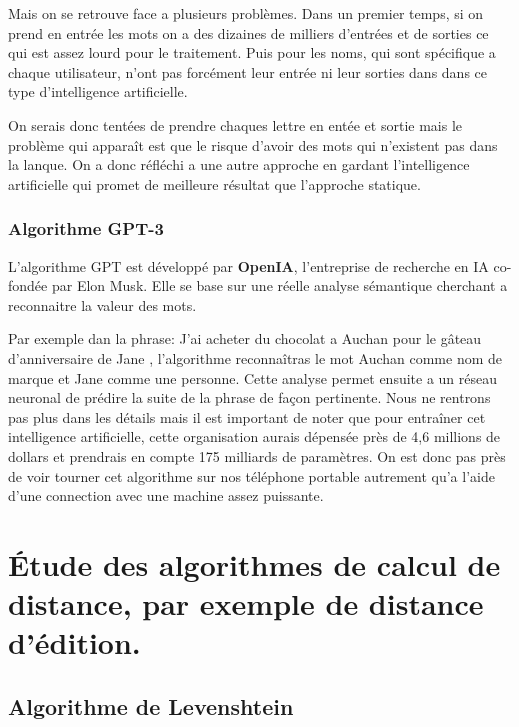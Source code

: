 \documentclass[final, 10pt]{report}
\begin{document}
        Mais on se retrouve face a plusieurs problèmes. 
        Dans un premier temps, si on prend en entrée les mots on a des dizaines de milliers d'entrées et de sorties ce qui est assez lourd pour le traitement.
        Puis pour les noms, qui sont spécifique a chaque utilisateur, n'ont pas forcément leur entrée ni leur sorties dans dans ce type d'intelligence artificielle.
        
        On serais donc tentées de prendre chaques lettre en entée et sortie mais le problème qui apparaît est que le risque d'avoir des mots qui n'existent pas dans la lanque.
        On a donc réfléchi a une autre approche en gardant l'intelligence artificielle qui promet de meilleure résultat que l'approche statique.
    
    \subsection{Algorithme GPT-3}


        L'algorithme GPT est développé par \textbf{OpenIA}, l’entreprise de recherche en IA co-fondée par Elon Musk\cite{noauthor_quest_2021}.
        Elle se base sur une réelle analyse sémantique cherchant a reconnaitre la valeur des mots.
        
        Par exemple dan la phrase: \og J'ai acheter du chocolat a Auchan pour le gâteau d'anniversaire de Jane \fg{}, l'algorithme reconnaîtras le mot \og Auchan \fg{} comme nom de marque et \og Jane \fg{} comme une personne.
        Cette analyse permet ensuite a un réseau neuronal de prédire la suite de la phrase de façon pertinente.
        Nous ne rentrons pas plus dans les détails mais il est important de noter que pour entraîner cet intelligence artificielle, cette organisation aurais dépensée près de 4,6 millions de dollars\cite{noauthor_quest_2021} et prendrais en compte 175 milliards de paramètres\cite{noauthor_quest_2021}.
        On est donc pas près de voir tourner cet algorithme sur nos téléphone portable autrement qu'a l'aide d'une connection avec une machine assez puissante.

\chapter{Étude des algorithmes de calcul de distance, par exemple de distance d’édition.}

\section{Algorithme de Levenshtein}
\end{document}
